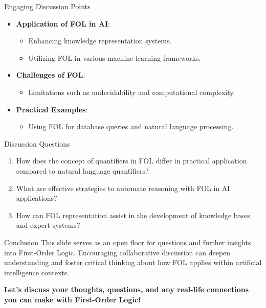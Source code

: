 \documentclass[aspectratio=169]{beamer}
\begin{document}
\begin{frame}[fragile]{Engaging Discussion Points}
    \begin{itemize}
        \item \textbf{Application of FOL in AI}:
            \begin{itemize}
                \item Enhancing knowledge representation systems.
                \item Utilizing FOL in various machine learning frameworks.
            \end{itemize}
        
        \item \textbf{Challenges of FOL}:
            \begin{itemize}
                \item Limitations such as undecidability and computational complexity.
            \end{itemize}
        
        \item \textbf{Practical Examples}:
            \begin{itemize}
                \item Using FOL for database queries and natural language processing.
            \end{itemize}
    \end{itemize}
\end{frame}

\begin{frame}[fragile]{Discussion Questions}
    \begin{enumerate}
        \item How does the concept of quantifiers in FOL differ in practical application compared to natural language quantifiers?
        \item What are effective strategies to automate reasoning with FOL in AI applications?
        \item How can FOL representation assist in the development of knowledge bases and expert systems?
    \end{enumerate}
\end{frame}

\begin{frame}[fragile]{Conclusion}
    This slide serves as an open floor for questions and further insights into First-Order Logic. Encouraging collaborative discussion can deepen understanding and foster critical thinking about how FOL applies within artificial intelligence contexts.

    \textbf{Let’s discuss your thoughts, questions, and any real-life connections you can make with First-Order Logic!}
\end{frame}
\end{document}
